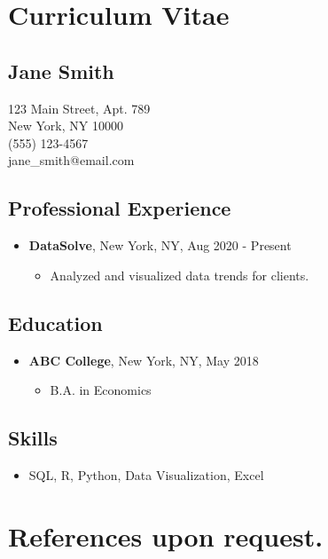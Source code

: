 \documentclass[12pt]{article}
\begin{document}
\section*{Curriculum Vitae}

\subsection*{\large Jane Smith}
\vspace{-3mm}
\begin{flushleft}
123 Main Street, Apt. 789 \\
New York, NY 10000 \\
(555) 123-4567 \\
jane\_smith@email.com
\end{flushleft}

\subsection*{Professional Experience}
\vspace{-1mm}
\begin{itemize}
    \item{\textbf{DataSolve}, New York, NY, Aug 2020 - Present}
        \begin{itemize}
            \item[] Analyzed and visualized data trends for clients.
        \end{itemize}
\end{itemize}

\subsection*{Education}
\vspace{-1mm}
\begin{itemize}
    \item{\textbf{ABC College}, New York, NY, May 2018}
        \begin{itemize}
            \item[] B.A. in Economics
        \end{itemize}
\end{itemize}

\subsection*{Skills}
\vspace{-1mm}
\begin{itemize}
    \item[] SQL, R, Python, Data Visualization, Excel
\end{itemize}

\section*{References upon request.}
\end{document}
